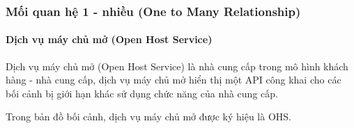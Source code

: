 








\subsubsection{Mối quan hệ 1 - nhiều (One to Many Relationship)}

\paragraph{Dịch vụ máy chủ mở (Open Host Service)}   Dịch vụ máy chủ mở (Open Host Service) là nhà cung cấp trong mô hình khách hàng - nhà cung cấp, dịch vụ máy chủ mở hiển thị một API công khai cho các bối cảnh bị giới hạn khác sử dụng chức năng của nhà cung cấp.

Trong bản đồ bối cảnh, dịch vụ máy chủ mở được ký hiệu là OHS.













